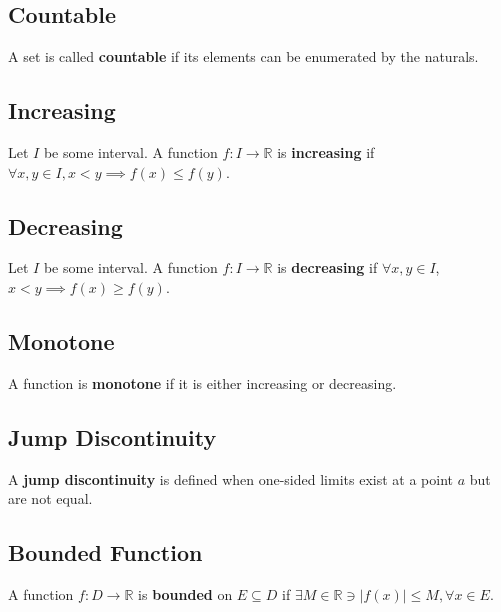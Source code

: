 \documentclass[11pt]{book}
\newcommand{\R}{\mathbb{R}}
\begin{document}
	\subsection{Countable}
	\label{subsec:countable}
		\begin{defin}
			A set is called \textbf{countable} if its elements can be enumerated by the naturals.
		\end{defin}
	\subsection{Increasing}
	\label{subsec:increasing}
		\begin{defin}
			Let $I$ be some interval. A function $f: I \to \R$ is \textbf{increasing} if $\forall x,y \in I, x < y \implies f(x) \leq f(y)$.
		\end{defin}
	\subsection{Decreasing}
	\label{subsec:decreasing}
		\begin{defin}
			Let $I$ be some interval. A function $f:I \to \R$ is \textbf{decreasing} if $\forall x,y \in I$, $x < y \implies f(x) \geq f(y)$. 
		\end{defin}
	\subsection{Monotone}
	\label{subsec:monotone}
		\begin{defin}
			A function is \textbf{monotone} if it is either increasing or decreasing.
		\end{defin}
	\subsection{Jump Discontinuity}
	\label{subsec:jumpdiscontinuity}
		\begin{defin}
			A \textbf{jump discontinuity} is defined when one-sided limits exist at a point $a$ but are not equal.
		\end{defin}
	\subsection{Bounded Function}
	\label{subsec:bounded}
		\begin{defin}
			A function $f: D \to \R$ is \textbf{bounded} on $E \subseteq D$ if $\exists M \in \R \ni |f(x)| \leq M, \forall x \in E$.
		\end{defin}
\end{document}
